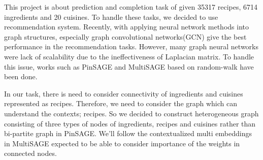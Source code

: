 This project is about prediction and completion task of given 35317 recipes, 6714 ingredients and 20 cuisines. To handle these tasks, we decided to use recommendation system. Recently, with applying neural network methods into graph structures, especially graph convolutional networks(GCN) give the best performance in the recommendation tasks. However, many graph neural networks were lack of scalability due to the ineffectiveness of Laplacian matrix. To handle this issue, works such as PinSAGE and MultiSAGE based on random-walk have been done. 

In our task, there is need to consider connectivity of ingredients and cuisines represented as recipes. Therefore, we need to consider the graph which can understand the contexts; recipes. So we decided to construct heterogeneous graph consisting of three types of nodes of ingredients, recipes and cuisines rather than bi-partite graph in PinSAGE. We'll follow the contextualized multi embeddings in MultiSAGE expected to be able to consider importance of the weights in connected nodes.